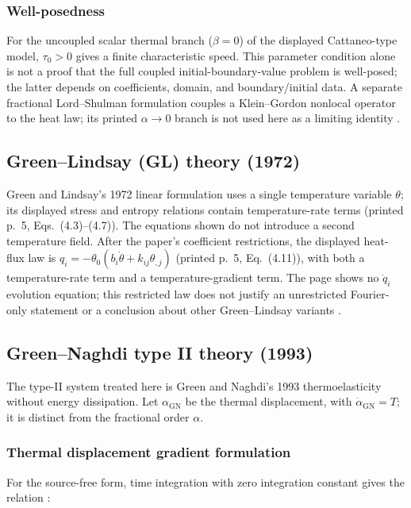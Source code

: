 \subsubsection{Well-posedness}

For the uncoupled scalar thermal branch ($\beta=0$) of the displayed Cattaneo-type model, $\tau_0>0$ gives a finite characteristic speed. This parameter condition alone is not a proof that the full coupled initial-boundary-value problem is well-posed; the latter depends on coefficients, domain, and boundary/initial data. A separate fractional Lord--Shulman formulation couples a Klein--Gordon nonlocal operator to the heat law; its printed $\alpha\to0$ branch is not used here as a limiting identity \cite{Das2026}.

\subsection{Green--Lindsay (GL) theory (1972)}
\label{sec:4.4}

Green and Lindsay's 1972 linear formulation uses a single temperature variable $\theta$; its displayed stress and entropy relations contain temperature-rate terms (printed p.~5, Eqs.~(4.3)--(4.7)). The equations shown do not introduce a second temperature field. After the paper's coefficient restrictions, the displayed heat-flux law is $q_i=-\theta_0(b_i\dot{\theta}+k_{ij}\theta_{,j})$ (printed p.~5, Eq.~(4.11)), with both a temperature-rate term and a temperature-gradient term. The page shows no $\dot q_i$ evolution equation; this restricted law does not justify an unrestricted Fourier-only statement or a conclusion about other Green--Lindsay variants \cite{Green1972}.

\subsection{Green--Naghdi type II theory (1993)}
\label{sec:4.5}

The type-II system treated here is Green and Naghdi's 1993 thermoelasticity without energy dissipation. Let $\alpha_{\mathrm{GN}}$ be the thermal displacement, with $\dot{\alpha}_{\mathrm{GN}}=T$; it is distinct from the fractional order $\alpha$.

\subsubsection{Thermal displacement gradient formulation}

For the source-free form, time integration with zero integration constant gives the relation \cite{Green1993}:

